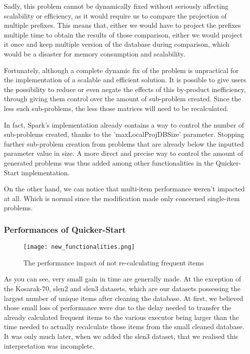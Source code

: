\documentclass{eplmastersthesis}
\begin{document}
\begin{enumerate}
Sadly, this problem cannot be dynamically fixed without seriously affecting scalability or efficiency, as it would require us to compare the projection of multiple prefixes. This means that, either we would have to project the prefixes multiple time to obtain the results of those comparison, either we would project it once and keep multiple version of the database during comparison, which would be a disaster for memory consumption and scalability.\newline

Fortunately, although a complete dynamic fix of the problem is unpractical for the implementation of a scalable and efficient solution. It is possible to give users the possibility to reduce or even negate the effects of this by-product inefficiency, through giving them control over the amount of sub-problem created. Since the less such sub-problems, the less those matrices will need to be recalculated. \newline

In fact, Spark's implementation already contains a way to control the number of sub-problems created, thanks to the 'maxLocalProjDBSize' parameter. Stopping further sub-problem creation from problems that are already below the inputted parameter value in size. A more direct and precise way to control the amount of generated problems was thus added among other functionalities in the Quicker-Start implementation.

\end{enumerate}

On the other hand, we can notice that multi-item performance weren't impacted at all. Which is normal since the modification made only concerned single-item problems. \newline

\subsubsection{Performances of Quicker-Start}

\begin{figure}[h]
  \centering
  \texttt{[image: new\_functionalities.png]}
  \caption{The performance impact of not re-calculating frequent items}
  \label{fig:new_functionalities_perf}
\end{figure}

As you can see, very small gain in time are generally made. At the exception of the Kosarak-70, slen2 and slen3 datasets, which are our datasets possessing the largest number of unique items after cleaning the database. At first, we believed those small loss of performance were due to the delay needed to transfer the already calculated frequent items to the various executor being larger than the time needed to actually recalculate those items from the small cleaned database. It was only much later, when we added the slen3 dataset, that we realised this interpretation was incomplete.\newline
\end{document}
